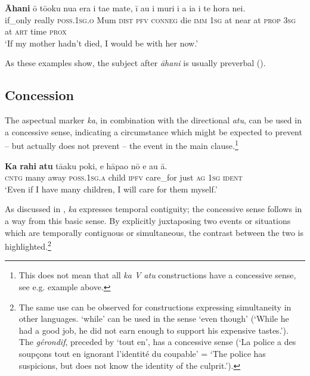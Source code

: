 \ea\label{ex:11.265}
\gll \textbf{{\ꞌ}Āhani} {\ꞌ}ō tō{\ꞌ}oku nua era i ta{\ꞌ}e mate,  {\ꞌ}ī au {\ꞌ}i muri i a ia {\ꞌ}i te hora nei.\\
if\_only really \textsc{poss.1sg.o} Mum \textsc{dist} \textsc{pfv} \textsc{conneg} die  \textsc{imm} \textsc{1sg} at near at \textsc{prop} \textsc{3sg} at \textsc{art} time \textsc{prox}\\

\glt
‘If my mother hadn’t died, I would be with her now.’ \textstyleExampleref{[R245.007]} 
\z

As these examples show, the subject after \textit{{\ꞌ}āhani} is usually preverbal (). 

\subsection{Concession}\label{sec:11.6.7}
The aspectual marker \textit{ka}, in combination with the directional \textit{atu}, can be used in a concessive sense, indicating a circumstance which might be expected to prevent – but actually does not prevent – the event in the main clause.\footnote{\label{fn:535}This does not mean that all \textit{ka V atu} constructions have a concessive sense, see e.g. example  above.}

\ea\label{ex:11.266}
\gll \textbf{Ka} \textbf{rahi} \textbf{atu} tā{\ꞌ}aku poki, e hāpa{\ꞌ}o nō e au {\ꞌ}ā. \\
\textsc{cntg} many away \textsc{poss.1sg.a} child \textsc{ipfv} care\_for just \textsc{ag} \textsc{1sg} \textsc{ident} \\

\glt
‘Even if I have many children, I will care for them myself.’ \textstyleExampleref{[R229.023]} 
\z

As discussed in , \textit{ka} expresses temporal contiguity; the concessive sense follows in a way from this basic sense. By explicitly juxtaposing two events or situations which are temporally contiguous or simultaneous, the contrast between the two is highlighted.\footnote{\label{fn:536}The same use can be observed for constructions expressing simultaneity in other languages.  ‘while’ can be used in the sense ‘even though’ (‘While he had a good job, he did not earn enough to support his expensive tastes.’). The  \textit{gérondif}, preceded by ‘tout en’, has a concessive sense (‘La police a des soupçons tout en ignorant l’identité du coupable’ = ‘The police has suspicions, but does not know the identity of the culprit.’).} 

